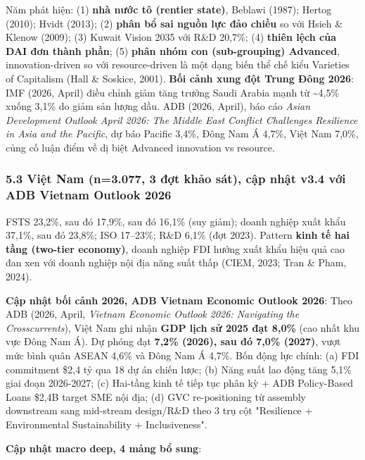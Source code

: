 \documentclass[12pt,a4paper]{article}
\begin{document}
Năm phát hiện: (1) \textbf{nhà nước tô (rentier state)}, Beblawi (1987);
Hertog (2010); Hvidt (2013); (2) \textbf{phân bổ sai nguồn lực đảo
chiều} so với Hsieh \& Klenow (2009); (3) Kuwait Vision 2035 với R\&D
20,7\%; (4) \textbf{thiên lệch của DAI đơn thành phần}; (5) \textbf{phân
nhóm con (sub-grouping) Advanced}, innovation-driven so với
resource-driven là một dạng biến thể chế kiểu Varieties of Capitalism
(Hall \& Soskice, 2001). \textbf{Bối cảnh xung đột Trung Đông 2026}: IMF
(2026, April) điều chỉnh giảm tăng trưởng Saudi Arabia mạnh từ
\textasciitilde4,5\% xuống 3,1\% do giảm sản lượng dầu. ADB (2026,
April), báo cáo \emph{Asian Development Outlook April 2026: The Middle
East Conflict Challenges Resilience in Asia and the Pacific}, dự báo
Pacific 3,4\%, Đông Nam Á 4,7\%, Việt Nam 7,0\%, củng cố luận điểm về dị
biệt Advanced innovation vs resource.

\hypertarget{53-viux1ec7t-nam-n3077-3-ux111ux1ee3t-khux1ea3o-suxe1t-cux1eadp-nhux1eadt-v34-vux1edbi-adb-vietnam-outlook-2026}{%
\subsubsection{5.3 Việt Nam (n=3.077, 3 đợt khảo sát), cập nhật v3.4 với
ADB Vietnam Outlook
2026}\label{53-viux1ec7t-nam-n3077-3-ux111ux1ee3t-khux1ea3o-suxe1t-cux1eadp-nhux1eadt-v34-vux1edbi-adb-vietnam-outlook-2026}}

FSTS 23,2\%, sau đó 17,9\%, sau đó 16,1\% (suy giảm); doanh nghiệp xuất
khẩu 37,1\%, sau đó 23,8\%; ISO 17--23\%; R\&D 6,1\% (đợt 2023). Pattern
\textbf{kinh tế hai tầng (two-tier economy)}, doanh nghiệp FDI hướng
xuất khẩu hiệu quả cao đan xen với doanh nghiệp nội địa năng suất thấp
(CIEM, 2023; Tran \& Pham, 2024).

\textbf{Cập nhật bối cảnh 2026, ADB Vietnam Economic Outlook 2026}: Theo
ADB (2026, April, \emph{Vietnam Economic Outlook 2026: Navigating the
Crosscurrents}), Việt Nam ghi nhận \textbf{GDP lịch sử 2025 đạt 8,0\%}
(cao nhất khu vực Đông Nam Á). Dự phóng đạt \textbf{7,2\% (2026), sau đó
7,0\% (2027)}, vượt mức bình quân ASEAN 4,6\% và Đông Nam Á 4,7\%. Bốn
động lực chính: (a) FDI commitment \$2,4 tỷ qua 18 dự án chiến lược; (b)
Năng suất lao động tăng 5,1\% giai đoạn 2026-2027; (c) Hai-tầng kinh tế
tiếp tục phân kỳ + ADB Policy-Based Loans \$2,4B target SME nội địa; (d)
GVC re-positioning từ assembly downstream sang mid-stream design/R\&D
theo 3 trụ cột "Resilience + Environmental Sustainability +
Inclusiveness".

\textbf{Cập nhật macro deep, 4 mảng bổ sung}:
\end{document}
